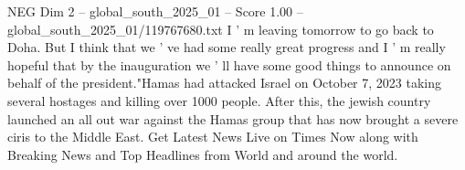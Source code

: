 \begin{textsample}{NEG Dim 2 – global\_south\_2025\_01 – Score 1.00 – global\_south\_2025\_01/119767680.txt}
I ' m leaving tomorrow to go back to Doha.
But I think that we ' ve had some really great progress and I ' m really hopeful that by the inauguration we ' ll have some good things to announce on behalf of the president."Hamas had attacked Israel on October 7, 2023 taking several hostages and killing over 1000 people.
After this, the jewish country launched an all out war against the Hamas group that has now brought a severe ciris to the Middle East.
Get Latest News Live on Times Now along with Breaking News and Top Headlines from World and around the world.

\end{textsample}
